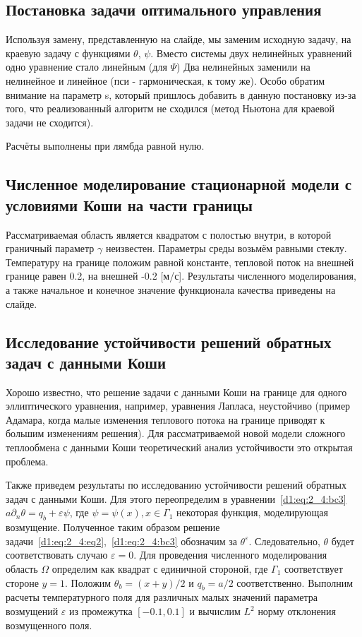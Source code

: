 \documentclass[8pt,a4paper]{article}
\begin{document}
    \subsection*{Постановка задачи оптимального управления}
    Используя замену, представленную на слайде, мы заменим исходную задачу, на краевую задачу
    с функциями $\theta$, $\psi$.
    Вместо системы двух нелинейных уравнений одно уравнение стало линейным (для $\Psi$)
    Два нелинейных заменили на нелинейное и линейное (пси - гармоническая, к тому же).
    Особо обратим внимание на параметр s, который пришлось добавить в данную постановку из-за
    того, что реализованный алгоритм не сходился (метод Ньютона для краевой задачи не сходится).

    Расчёты выполнены при лямбда равной нулю.

    \subsection*{Численное моделирование стационарной модели с условиями Коши на части границы}
    Рассматриваемая область является квадратом с полостью внутри, в которой граничный параметр $\gamma$ неизвестен.
    Параметры среды возьмём равными стеклу.
    Температуру на границе положим равной константе,
    тепловой поток на внешней границе равен 0.2, на внешней -0.2 [м/с].
    Результаты численного моделирования, а также начальное и конечное
    значение функционала качества приведены на слайде.



    \subsection*{Исследование устойчивости решений обратных задач с данными Коши}
    Хорошо известно, что решение задачи с данными
    Коши на границе для одного эллиптического уравнения,
    например, уравнения Лапласа, неустойчиво
    (пример Адамара, когда малые изменения теплового потока на границе приводят к большим изменениям решения).
    Для рассматриваемой новой модели сложного теплообмена с данными Коши
    теоретический анализ устойчивости это открытая проблема.


    Также приведем результаты по исследованию устойчивости решений
    обратных задач с данными Коши.
    Для этого переопределим в уравнении~\eqref{d1:eq:2_4:bc3} $a\partial_n \theta = q_b +\varepsilon \psi$,
    где $\psi = \psi(x), x \in \Gamma_1$ некоторая функция, моделирующая возмущение.
    Полученное таким образом решение задачи~\eqref{d1:eq:2_4:eq2},~\eqref{d1:eq:2_4:bc3}
    обозначим за $\theta^{\varepsilon}$.
    Следовательно, $\theta$ будет соответствовать случаю $\varepsilon = 0$.
    Для проведения численного моделирования область $\Omega$ определим
    как квадрат с единичной стороной, где $\Gamma_1$ соответствует стороне $y = 1$.
    Положим $\theta_b = (x + y) / 2$ и $q_b = a / 2$ соответственно.
    Выполним расчеты температурного поля
    для различных малых значений параметра возмущений $\varepsilon$
    из промежутка $[-0.1, 0.1]$ и вычислим $L^2$ норму отклонения возмущенного поля.
\end{document}
